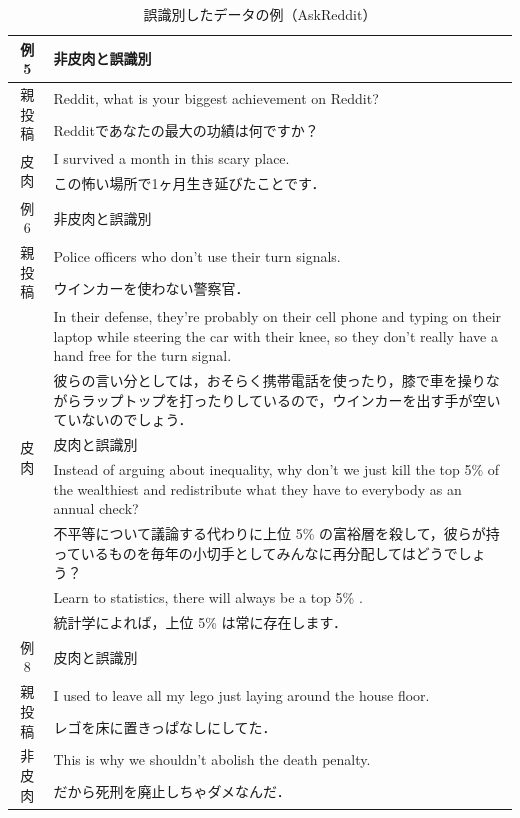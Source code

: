 \begin{table}[tb]
  \caption{誤識別したデータの例（AskReddit）}
  \label{tb:42_false_data_ask}
  \centering
  \begin{tabular}{c|p{120mm}} \hline

\multicolumn{1}{c}{例 5} & 非皮肉と誤識別 \\ \hline
\multirow{2}{*}{親投稿} & Reddit, what is your biggest achievement on Reddit? \\ \cline{2-2}
& Redditであなたの最大の功績は何ですか？ \\ \hline
\multirow{2}{*}{皮肉} & I survived a month in this scary place. \\ \cline{2-2}
& この怖い場所で1ヶ月生き延びたことです． \\ \hline
\hline
\multicolumn{1}{c}{例 6} & 非皮肉と誤識別 \\ \hline
\multirow{2}{*}{親投稿} & Police officers who don't use their turn signals.  \\ \cline{2-2}
& ウインカーを使わない警察官． \\ \hline
\multirow{6}{*}{皮肉} &  In their defense, they're probably on their cell phone and typing on their laptop while steering the car with their knee, so they don't really have a hand free for the turn signal. \\ \cline{2-2}
& 彼らの言い分としては，おそらく携帯電話を使ったり，膝で車を操りながらラップトップを打ったりしているので，ウインカーを出す手が空いていないのでしょう． \\ \hline
\hline
\multicolumn{1}{c}{例 7} & 皮肉と誤識別 \\ \hline
\multirow{6}{*}{親投稿} & Instead of arguing about inequality, why don't we just kill the top 5\% of the wealthiest and redistribute what they have to everybody as an annual check? \\ \cline{2-2}
& 不平等について議論する代わりに上位 5\% の富裕層を殺して，彼らが持っているものを毎年の小切手としてみんなに再分配してはどうでしょう？ \\ \hline
\multirow{2}{*}{非皮肉} & Learn to statistics, there will always be a top 5\% . \\ \cline{2-2}
& 統計学によれば，上位 5\% は常に存在します． \\ \hline
\hline
\multicolumn{1}{c}{例 8} & 皮肉と誤識別 \\ \hline
\multirow{2}{*}{親投稿} & I used to leave all my lego just laying around the house floor. \\ \cline{2-2}
& レゴを床に置きっぱなしにしてた． \\ \hline
\multirow{2}{*}{非皮肉} & This is why we shouldn't abolish the death penalty. \\ \cline{2-2}
& だから死刑を廃止しちゃダメなんだ． \\ \hline

  \end{tabular}
\end{table}



